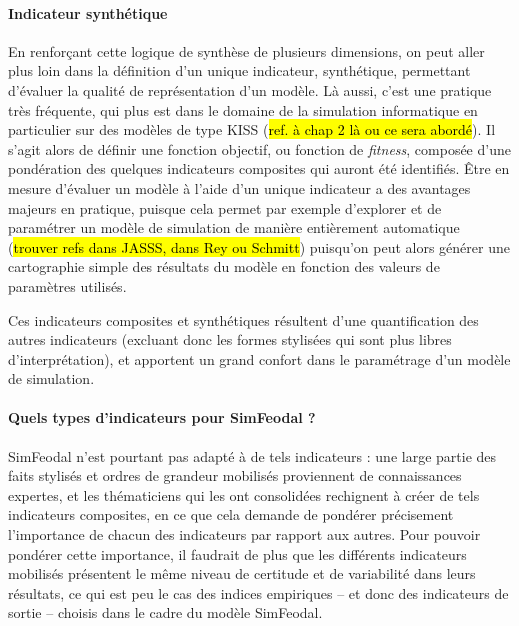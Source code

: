\paragraph{Indicateur synthétique}

En renforçant cette logique de synthèse de plusieurs dimensions, on peut aller plus loin dans la définition d'un unique indicateur, synthétique, permettant d'évaluer la qualité de représentation d'un modèle. Là aussi, c'est une pratique très fréquente, qui plus est dans le domaine de la simulation informatique en particulier sur des modèles de type \og KISS\fg{} (\hl{ref. à chap 2 là ou ce sera abordé}). Il s'agit alors de définir une \og fonction objectif\fg{}, ou \og fonction de \textit{fitness}\fg{}, composée d'une pondération des quelques indicateurs composites qui auront été identifiés. Être en mesure d'évaluer un modèle à l'aide d'un unique indicateur a des avantages majeurs en pratique, puisque cela permet par exemple d'explorer et de paramétrer un modèle de simulation de manière entièrement automatique (\hl{trouver refs dans JASSS, dans Rey ou Schmitt}) puisqu'on peut alors générer une cartographie simple des résultats du modèle en fonction des valeurs de paramètres utilisés.

Ces indicateurs composites et synthétiques résultent d'une quantification des autres indicateurs (excluant donc les formes stylisées qui sont plus libres d'interprétation), et apportent un grand confort dans le paramétrage d'un modèle de simulation.

\paragraph{Quels types d'indicateurs pour SimFeodal ?}

SimFeodal n'est pourtant pas adapté à de tels indicateurs : une large partie des faits stylisés et ordres de grandeur mobilisés proviennent de connaissances expertes, et les thématiciens qui les ont consolidées rechignent à créer de tels indicateurs composites, en ce que cela demande de pondérer précisement l'importance de chacun des indicateurs par rapport aux autres.
Pour pouvoir pondérer cette importance, il faudrait de plus que les différents indicateurs mobilisés présentent le même niveau de certitude et de variabilité dans leurs résultats, ce qui est peu le cas des indices empiriques -- et donc des indicateurs de sortie -- choisis dans le cadre du modèle SimFeodal.

